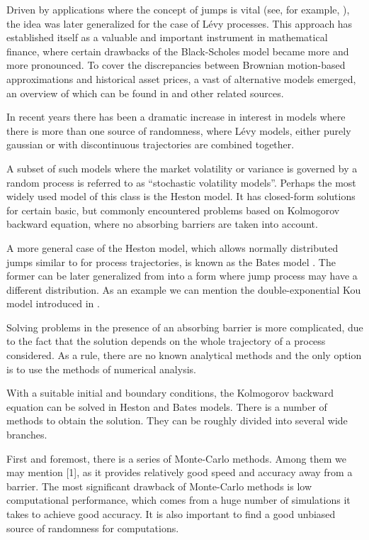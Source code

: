 \documentclass[a4paper]{jpconf}
\begin{document}
Driven by applications where the concept of jumps is vital (see, for example, \cite{cont_tankov}), the idea was later generalized for the case of L\'evy processes.
This approach has established itself as a valuable and important instrument in mathematical finance, where certain drawbacks of the Black-Scholes model \cite{b_s} became more and more pronounced.
To cover the discrepancies between Brownian motion-based approximations and historical asset prices, a vast of alternative models emerged, an overview of which can be found in \cite{cont_tankov, itkin} and other related sources.

In recent years there has been a dramatic increase in interest in models where there is more than one source of randomness, where L\'evy models, either purely gaussian or with discontinuous trajectories are combined together.

A subset of such models where the market volatility or variance is governed by a random process is referred to as ``stochastic volatility models''. Perhaps the most widely used model of this class is the Heston \cite{heston} model. It has closed-form solutions for certain basic, but commonly encountered problems based on Kolmogorov backward equation, where no absorbing barriers are taken into account.

A more general case of the Heston model, which allows normally distributed jumps similar to \cite{merton} for process trajectories, is known as the Bates model \cite{bates}. The former can be later generalized from into a form where jump process may have a different distribution. As an example we can mention the double-exponential Kou model introduced in \cite{kou}.

Solving problems in the presence of an absorbing barrier is more complicated, due to the fact that the solution depends on the whole trajectory of a process considered. As a rule, there are no known analytical methods and the only option is to use the methods of numerical analysis.

With a suitable initial and boundary conditions, the Kolmogorov backward equation can be solved in Heston and Bates models. There is a number of methods to obtain the solution. They can be roughly divided into several wide branches.

First and foremost, there is a series of Monte-Carlo methods. Among them we may mention [1], as it provides relatively good speed and accuracy away from a barrier. The most significant drawback of Monte-Carlo methods is low computational performance, which comes from a huge number of simulations it takes to achieve good accuracy. It is also important to find a good unbiased source of randomness for computations.
\end{document}
